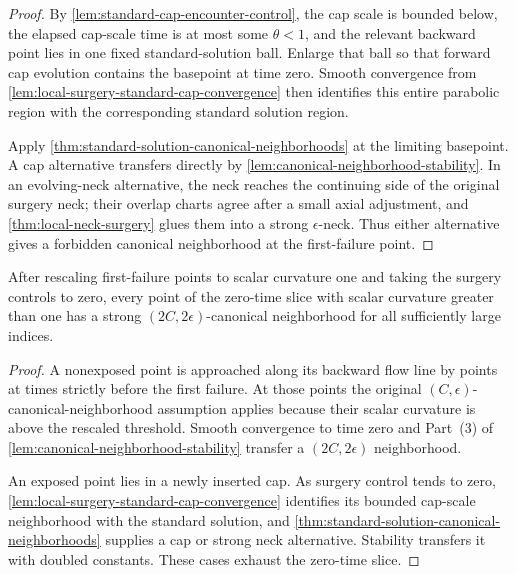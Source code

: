\begin{proof}
By \ref{lem:standard-cap-encounter-control}, the cap scale is bounded below,
the elapsed cap-scale time is at most some $\theta<1$, and the relevant
backward point lies in one fixed standard-solution ball.  Enlarge that ball
so that forward cap evolution contains the basepoint at time zero.  Smooth
convergence from \ref{lem:local-surgery-standard-cap-convergence} then
identifies this entire parabolic region with the corresponding standard
solution region.

Apply \ref{thm:standard-solution-canonical-neighborhoods} at the limiting
basepoint.  A cap alternative transfers directly by
\ref{lem:canonical-neighborhood-stability}.  In an evolving-neck
alternative, the neck reaches the continuing side of the original surgery
neck; their overlap charts agree after a small axial adjustment, and
\ref{thm:local-neck-surgery} glues them into a strong
$\epsilon$-neck.  Thus either alternative gives a forbidden canonical
neighborhood at the first-failure point.
\end{proof}

\begin{lemma}
\label{lem:rescaled-high-curvature-canonical-control}
\notready
After rescaling first-failure points to scalar curvature one and taking the
surgery controls to zero, every point of the zero-time slice with scalar
curvature greater than one has a strong
$(2C,2\epsilon)$-canonical neighborhood for all sufficiently large indices.
\end{lemma}

\begin{proof}
A nonexposed point is approached along its backward flow line by points at
times strictly before the first failure.  At those points the original
$(C,\epsilon)$-canonical-neighborhood assumption applies because their
scalar curvature is above the rescaled threshold.  Smooth convergence to
time zero and Part~(3) of
\ref{lem:canonical-neighborhood-stability} transfer a
$(2C,2\epsilon)$ neighborhood.

An exposed point lies in a newly inserted cap.  As surgery control tends to
zero, \ref{lem:local-surgery-standard-cap-convergence} identifies its
bounded cap-scale neighborhood with the standard solution, and
\ref{thm:standard-solution-canonical-neighborhoods} supplies a cap or strong
neck alternative.  Stability transfers it with doubled constants.  These
cases exhaust the zero-time slice.
\end{proof}

